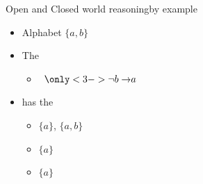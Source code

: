 \begin{frame}{Open and Closed world reasoning}{by example}
  \bigskip
  \begin{itemize}
  \item Alphabet $\{a,b\}$
    \medskip
  \item<2-> The 
    \begin{itemize}
    \item \normalsize \ \( \only<3->{\neg b\to} a \)
    \end{itemize}  \item<2->[] has the
    \par\smallskip
    \begin{itemize}\normalsize
    \item {}         $\{a\}$, $\{a,b\}$
      \smallskip
    \item {} $\{a\}$
      \smallskip
    \item {}  $\{a\}$
    \end{itemize}
  \end{itemize}
\end{frame}
%
